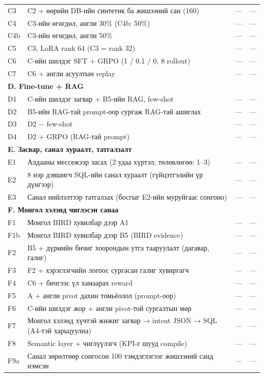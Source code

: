 \begin{small}
\begin{longtable}{p{1.0cm}p{7.6cm}rr}
C3 & C2 + өөрийн DB-ийн синтетик ба жишээний сан (160) & — & — \\
C4 & C3-ийн өгөгдөл, англи 30\% (C4b: 50\%) & — & — \\
C4b & C3-ийн өгөгдөл, англи 50\% & — & — \\
C5 & C3, LoRA rank 64 (C3 = rank 32) & — & — \\
C6 & C-ийн шилдэг SFT + GRPO (1 / 0.1 / 0, 8 rollout) & — & — \\
C7 & C6 + англи асуултын replay & — & — \\
\multicolumn{4}{l}{\textbf{D. Fine-tune + RAG}}\\
D1 & C-ийн шилдэг загвар + B5-ийн RAG, few-shot & — & — \\
D2 & B5-ийн RAG-тай prompt-оор сургаж RAG-тай ашиглах & — & — \\
D3 & D2 − few-shot & — & — \\
D4 & D2 + GRPO (RAG-тай prompt) & — & — \\
\multicolumn{4}{l}{\textbf{E. Засвар, санал хураалт, татгалзалт}}\\
E1 & Алдааны мессежээр засах (2 удаа хүртэл; төлөвлөгөө: 1–3) & — & — \\
E2 & 8 нэр дэвшигч SQL-ийн санал хураалт (гүйцэтгэлийн үр дүнгээр) & — & — \\
E3 & Санал нийлэлтээр татгалзах (босгыг E2-ийн муруйгаас сонгоно) & — & — \\
\multicolumn{4}{l}{\textbf{F. Монгол хэлэнд чиглэсэн санаа}}\\
F1 & Монгол BIRD хувилбар дээр A1 & — & — \\
F1b & Монгол BIRD хувилбар дээр B5 (BIRD evidence) & — & — \\
F2 & B5 + дүрмийн бичиг хоорондын утга тааруулалт (дагавар, галиг) & — & — \\
F3 & F2 + хэрэглэгчийн логоос сургасан галиг хувиргагч & — & — \\
F4 & C6 + бичгээс үл хамаарах reward & — & — \\
F5 & A + англи pivot дахин томьёолол (prompt-оор) & — & — \\
F6 & C-ийн шилдэг жор + англи pivot-той сургалтын мөр & — & — \\
F7 & Монгол хэлэнд хүчтэй жижиг загвар → intent JSON → SQL (A4-тэй харьцуулна) & — & — \\
F8 & Semantic layer + чиглүүлэгч (KPI-г шууд compile) & — & — \\
F9a & Санал зөрөлтөөр сонгосон 100 тэмдэглэгээг жишээний санд нэмсэн & — & — \\

\end{longtable}
\end{small}
